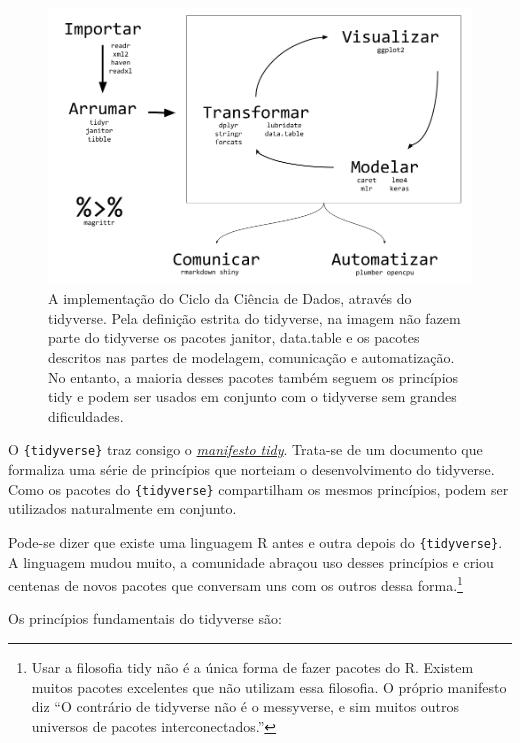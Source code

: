 \documentclass[
]{book}
\begin{document}
\begin{figure}

{\centering \includegraphics[width=13.31in]{assets/img/pacotes/ciclo-ciencia-de-dados-pacotes} 

}

\caption{A implementação do Ciclo da Ciência de Dados, através do tidyverse. Pela definição estrita do tidyverse, na imagem não fazem parte do tidyverse os pacotes janitor, data.table e os pacotes descritos nas partes de modelagem, comunicação e automatização. No entanto, a maioria desses pacotes também seguem os princípios tidy e podem ser usados em conjunto com o tidyverse sem grandes dificuldades.}\label{fig:04-ciclo-pacotes}
\end{figure}

O \texttt{\{tidyverse\}} traz consigo o \href{https://cran.r-project.org/web/packages/tidyverse/vignettes/manifesto.html}{\emph{manifesto tidy}}. Trata-se de um documento que formaliza uma série de princípios que norteiam o desenvolvimento do tidyverse. Como os pacotes do \texttt{\{tidyverse\}} compartilham os mesmos princípios, podem ser utilizados naturalmente em conjunto.

Pode-se dizer que existe uma linguagem R antes e outra depois do \texttt{\{tidyverse\}}. A linguagem mudou muito, a comunidade abraçou uso desses princípios e criou centenas de novos pacotes que conversam uns com os outros dessa forma.\footnote{Usar a filosofia tidy não é a única forma de fazer pacotes do R. Existem muitos pacotes excelentes que não utilizam essa filosofia. O próprio manifesto diz ``O contrário de tidyverse não é o messyverse, e sim muitos outros universos de pacotes interconectados.''}

Os princípios fundamentais do tidyverse são:
\end{document}
